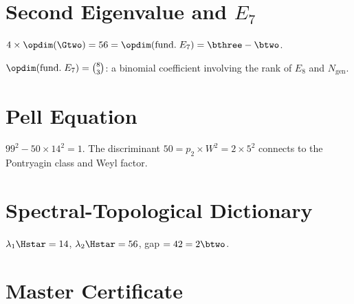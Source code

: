 \section{Second Eigenvalue and $E_7$}

\begin{theorem}[$\lambda_2 \times \Hstar = \opdim(\mathrm{fund.}\; E_7)$]\label{thm:second_ev_E7}
    \leanok
    $4 \times \opdim(\Gtwo) = 56 = \opdim(\mathrm{fund.}\; E_7) = \bthree - \btwo$.
\end{theorem}

\begin{theorem}[$56 = C(\mathrm{rank}(E_8), N_{\mathrm{gen}})$]\label{thm:second_ev_binom}
    \leanok
    $\opdim(\mathrm{fund.}\; E_7) = \binom{8}{3}$: a binomial coefficient
    involving the rank of $E_8$ and $N_{\mathrm{gen}}$.
\end{theorem}

\section{Pell Equation}

\begin{theorem}\label{thm:pell_eq}
    \leanok
    $99^2 - 50 \times 14^2 = 1$. The discriminant $50 = p_2 \times W^2 = 2 \times 5^2$
    connects to the Pontryagin class and Weyl factor.
\end{theorem}

\section{Spectral-Topological Dictionary}

\begin{theorem}\label{thm:spectral_ladder}
    \leanok
    $\lambda_1 \Hstar = 14$, $\lambda_2 \Hstar = 56$,
    gap $= 42 = 2\btwo$.
\end{theorem}

\section{Master Certificate}


